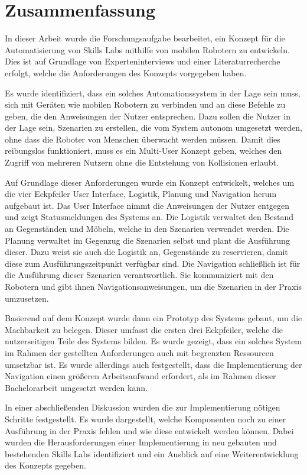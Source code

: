 \section{Zusammenfassung}

In dieser Arbeit wurde die Forschungsaufgabe bearbeitet, ein Konzept für die Automatisierung von Skills Labs mithilfe von mobilen Robotern zu entwickeln. Dies ist auf Grundlage von Experteninterviews und einer Literaturrecherche erfolgt, welche die Anforderungen des Konzepts vorgegeben haben.

Es wurde identifiziert, dass ein solches Automationssystem in der Lage sein muss, sich mit Geräten wie mobilen Robotern zu verbinden und an diese Befehle zu geben, die den Anweisungen der Nutzer entsprechen. Dazu sollen die Nutzer in der Lage sein, Szenarien zu erstellen, die vom System autonom umgesetzt werden, ohne dass die Roboter von Menschen überwacht werden müssen. Damit dies reibungslos funktioniert, muss es ein Multi-User Konzept geben, welches den Zugriff von mehreren Nutzern ohne die Entstehung von Kollisionen erlaubt.

Auf Grundlage dieser Anforderungen wurde ein Konzept entwickelt, welches um die vier Eckpfeiler User Interface, Logistik, Planung und Navigation herum aufgebaut ist. Das User Interface nimmt die Anweisungen der Nutzer entgegen und zeigt Statusmeldungen des Systems an. Die Logistik verwaltet den Bestand an Gegenständen und Möbeln, welche in den Szenarien verwendet werden. Die Planung verwaltet im Gegenzug die Szenarien selbst und plant die Ausführung dieser. Dazu weist sie auch die Logistik an, Gegenstände zu reservieren, damit diese zum Ausführungszeitpunkt verfügbar sind. Die Navigation schließlich ist für die Ausführung dieser Szenarien verantwortlich. Sie kommuniziert mit den Robotern und gibt ihnen Navigationsanweisungen, um die Szenarien in der Praxis umzusetzen.

Basierend auf dem Konzept wurde dann ein Prototyp des Systems gebaut, um die Machbarkeit zu belegen. Dieser umfasst die ersten drei Eckpfeiler, welche die nutzerseitigen Teile des Systems bilden. Es wurde gezeigt, dass ein solches System im Rahmen der gestellten Anforderungen auch mit begrenzten Ressourcen umsetzbar ist. Es wurde allerdings auch festgestellt, dass die Implementierung der Navigation einen größeren Arbeitsaufwand erfordert, als im Rahmen dieser Bachelorarbeit umgesetzt werden kann.

In einer abschließenden Diskussion wurden die zur Implementierung nötigen Schritte festgestellt. Es wurde dargestellt, welche Komponenten noch zu einer Ausführung in der Praxis fehlen und wie diese entwickelt werden können. Dabei wurden die Herausforderungen einer Implementierung in neu gebauten und bestehenden Skills Labs identifiziert und ein Ausblick auf eine Weiterentwicklung des Konzepts gegeben.

